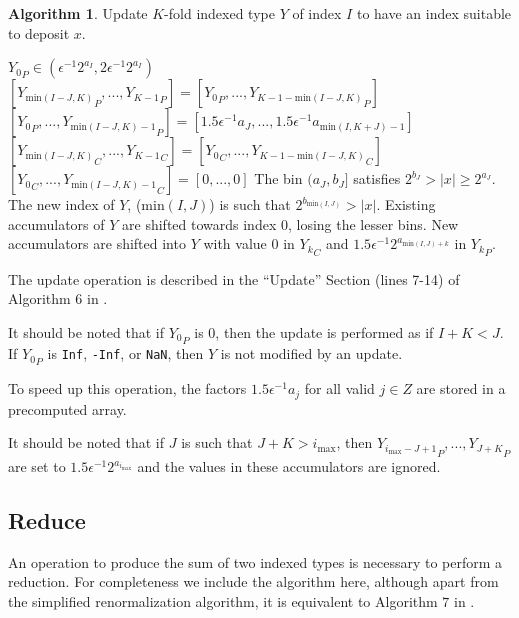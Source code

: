 \documentclass[12pt]{article}
\providecommand{\min}{\ensuremath{\text{min}}}
\providecommand{\max}{\ensuremath{\text{max}}}
\theoremstyle{definition}
\newtheorem{alg}{Algorithm}[section]
\numberwithin{equation}{section}
\numberwithin{figure}{section}
\begin{document}
    \begin{samepage}
    \begin{alg}
      Update $K$-fold indexed type $Y$ of index $I$ to have an index suitable to deposit $x$.
      \begin{algorithmic}[1]
        \Require
          \Statex ${Y_0}_P \in (\epsilon^{-1}  2^{a_{I}}, 2  \epsilon^{-1}  2^{a_I})$
          \State {}
          \State {}
            \State $[{Y_{\min(I - J, K)}}_P, ..., {Y_{K - 1}}_P] = [{Y_0}_P, ..., {Y_{K - 1 - \min(I - J, K)}}_P]$
            \State $[{Y_0}_P, ..., {Y_{\min(I - J, K) - 1}}_P] = [1.5  \epsilon^{-1}  a_{J}, ..., 1.5  \epsilon^{-1}  a_{\min(I, K + J) - 1}]$
            \State $[{Y_{\min(I - J, K)}}_C, ..., {Y_{K - 1}}_C] = [{Y_0}_C, ..., {Y_{K - 1 - \min(I - J, K)}}_C]$
            \State $[{Y_0}_C, ..., {Y_{\min(I - J, K) - 1}}_C] = [0, ..., 0]$
          \EndIf
        \EndFunction
        \Ensure
          \Statex The bin $(a_{J}, b_{J}]$ satisfies $2^{b_{J}} > |x| \geq 2^{a_{J}}$.
          \Statex The new index of $Y$, ($\min(I, J)$) is such that $2^{b_{\min(I, J)}} > |x|$.
          \Statex Existing accumulators of $Y$ are shifted towards index $0$, losing the lesser bins.
          \Statex New accumulators are shifted into $Y$ with value $0$ in ${Y_k}_C$ and $1.5  \epsilon^{-1}  2^{a_{\min(I, J) + k}}$ in ${Y_k}_P$.
      \end{algorithmic}
      \label{alg:update}
    \end{alg}
    \end{samepage}

    The update operation is described in the ``Update'' Section (lines 7-14) of Algorithm $6$ in \cite{repsum}.

    It should be noted that if ${Y_0}_P$ is 0, then the update is performed as if $I + K < J$. If ${Y_0}_P$ is \texttt{Inf}, \texttt{-Inf}, or \texttt{NaN}, then $Y$ is not modified by an update.

    To speed up this operation, the factors $1.5  \epsilon^{-1}  a_j$ for all valid $j \in Z$ are stored in a precomputed array.

    It should be noted that if $J$ is such that $J + K > i_{\max}$, then ${Y_{i_{\max} - J + 1}}_P, ...,  {Y_{J + K}}_P$ are set to $1.5 \epsilon^{-1}2^{a_{i_{\max}}}$ and the values in these accumulators are ignored.

  \subsection{Reduce}
    \label{sec:primitiveops_reduce}
    An operation to produce the sum of two indexed types is necessary to perform a reduction. For completeness we include the algorithm here, although apart from the simplified renormalization algorithm, it is equivalent to Algorithm $7$ in \cite{repsum}.
\end{document}
